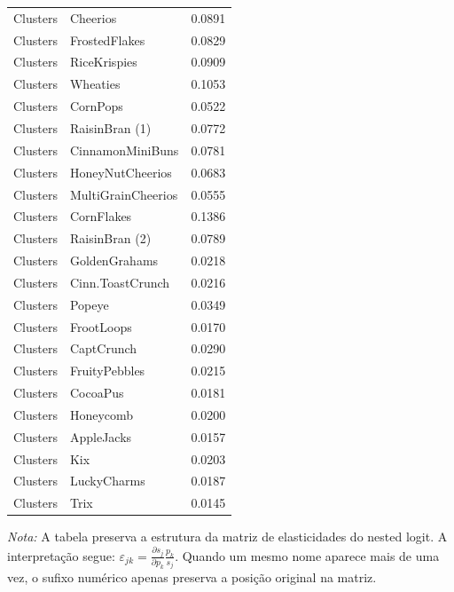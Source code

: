 \begin{table}[H]
\begin{tabular}{llr}
Clusters & Cheerios & 0.0891 \\
Clusters & FrostedFlakes & 0.0829 \\
Clusters & RiceKrispies & 0.0909 \\
Clusters & Wheaties & 0.1053 \\
Clusters & CornPops & 0.0522 \\
Clusters & RaisinBran (1) & 0.0772 \\
Clusters & CinnamonMiniBuns & 0.0781 \\
Clusters & HoneyNutCheerios & 0.0683 \\
Clusters & MultiGrainCheerios & 0.0555 \\
Clusters & CornFlakes & 0.1386 \\
Clusters & RaisinBran (2) & 0.0789 \\
Clusters & GoldenGrahams & 0.0218 \\
Clusters & Cinn.ToastCrunch & 0.0216 \\
Clusters & Popeye & 0.0349 \\
Clusters & FrootLoops & 0.0170 \\
Clusters & CaptCrunch & 0.0290 \\
Clusters & FruityPebbles & 0.0215 \\
Clusters & CocoaPus & 0.0181 \\
Clusters & Honeycomb & 0.0200 \\
Clusters & AppleJacks & 0.0157 \\
Clusters & Kix & 0.0203 \\
Clusters & LuckyCharms & 0.0187 \\
Clusters & Trix & 0.0145 \\
\bottomrule
\end{tabular}

\vspace{0.3em}
\footnotesize
\textit{Nota:} A tabela preserva a estrutura da matriz de elasticidades do nested logit. A interpretação segue: $\varepsilon_{jk}=\frac{\partial s_j}{\partial p_k}\frac{p_k}{s_j}$. Quando um mesmo nome aparece mais de uma vez, o sufixo numérico apenas preserva a posição original na matriz.
\end{table}
\endgroup


